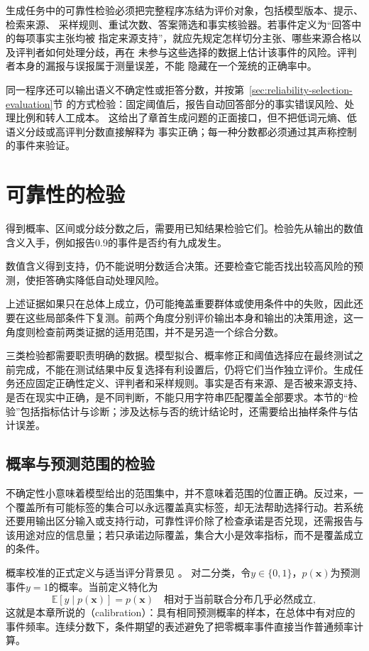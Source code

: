 生成任务中的可靠性检验必须把完整程序冻结为评价对象，包括模型版本、提示、检索来源、
采样规则、重试次数、答案筛选和事实核验器。若事件定义为“回答中的每项事实主张均被
指定来源支持”，就应先规定怎样切分主张、哪些来源合格以及评判者如何处理分歧，再在
未参与这些选择的数据上估计该事件的风险。评判者本身的漏报与误报属于测量误差，不能
隐藏在一个笼统的正确率中。

同一程序还可以输出语义不确定性或拒答分数，并按第~\ref{sec:reliability-selection-evaluation}节
的方式检验：固定阈值后，报告自动回答部分的事实错误风险、处理比例和转人工成本。
这给出了章首生成问题的正面接口，但不把低词元熵、低语义分歧或高评判分数直接解释为
事实正确；每一种分数都必须通过其声称控制的事件来验证。

\section{可靠性的检验}
\label{sec:reliability-evaluation}

得到概率、区间或分歧分数之后，需要用已知结果检验它们。检验先从输出的数值含义入手，例如报告0.9的事件是否约有九成发生。

数值含义得到支持，仍不能说明分数适合决策。还要检查它能否找出较高风险的预测，使拒答确实降低自动处理风险。

上述证据如果只在总体上成立，仍可能掩盖重要群体或使用条件中的失败，因此还要在这些局部条件下复测。前两个角度分别评价输出本身和输出的决策用途，这一角度则检查前两类证据的适用范围，并不是另造一个综合分数。

三类检验都需要职责明确的数据。模型拟合、概率修正和阈值选择应在最终测试之前完成，不能在测试结果中反复选择有利设置后，仍将它们当作独立评价。生成任务还应固定正确性定义、评判者和采样规则。事实是否有来源、是否被来源支持、是否在现实中正确，是不同判断，不能只用字符串匹配覆盖全部要求。本节的“检验”包括指标估计与诊断；涉及达标与否的统计结论时，还需要给出抽样条件与估计误差。

\subsection{概率与预测范围的检验}
\label{sec:reliability-output-evaluation}

不确定性小意味着模型给出的范围集中，并不意味着范围的位置正确。反过来，一个覆盖所有可能标签的集合可以永远覆盖真实标签，却无法帮助选择行动。若系统还要用输出区分输入或支持行动，可靠性评价除了检查承诺是否兑现，还需报告与该用途对应的信息量；若只承诺边际覆盖，集合大小是效率指标，而不是覆盖成立的条件。

概率校准的正式定义与适当评分背景见
。
对二分类，令$y\in\{0,1\}$，$p(\bm{x})$为预测事件$y=1$的概率。当前定义特化为
\begin{equation}
 \mathbb E[y\mid p(\bm{x})]=p(\bm{x})
\quad\text{相对于当前联合分布几乎必然成立},
 \label{eq:reliability-calibration}
\end{equation}
这就是本章所说的（calibration）：具有相同预测概率的样本，在总体中有对应的事件频率。连续分数下，条件期望的表述避免了把零概率事件直接当作普通频率计算。

